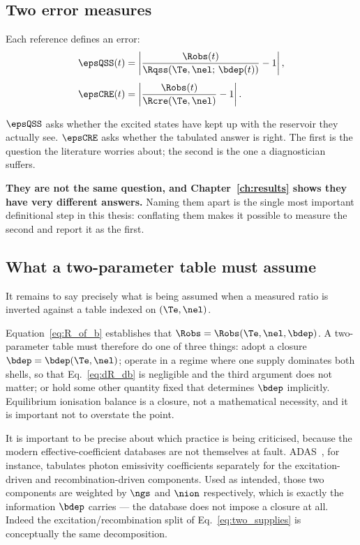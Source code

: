 \subsection{Two error measures}

Each reference defines an error:
\begin{align}
  \epsQSS(t) &= \left|\frac{\Robs(t)}
                     {\Rqss\!\left(\Te,\nel;\,\bdep(t)\right)} - 1\right|,
  \label{eq:eps_qss}\\[4pt]
  \epsCRE(t) &= \left|\frac{\Robs(t)}
                     {\Rcre\!\left(\Te,\nel\right)} - 1\right|.
  \label{eq:eps_cre}
\end{align}

$\epsQSS$ asks whether the excited states have kept up with the reservoir they
actually see. $\epsCRE$ asks whether the tabulated answer is right. The first is
the question the literature worries about; the second is the one a
diagnostician suffers.

\textbf{They are not the same question, and Chapter~\ref{ch:results} shows they
have very different answers.} Naming them apart is the single most important
definitional step in this thesis: conflating them makes it possible to measure
the second and report it as the first.

\subsection{What a two-parameter table must assume}

It remains to say precisely what is being assumed when a measured ratio is
inverted against a table indexed on $(\Te,\nel)$.

Equation~\eqref{eq:R_of_b} establishes that $\Robs = \Robs(\Te,\nel,\bdep)$.
A two-parameter table must therefore do one of three things: adopt a closure
$\bdep = \bdep(\Te,\nel)$; operate in a regime where one supply dominates both
shells, so that Eq.~\eqref{eq:dR_db} is negligible and the third argument does
not matter; or hold some other quantity fixed that determines $\bdep$
implicitly. Equilibrium ionisation balance is a closure, not a mathematical
necessity, and it is important not to overstate the point.

It is important to be precise about which practice is being criticised, because
the modern effective-coefficient databases are not themselves at fault.
ADAS~\cite{Summers2006}, for instance, tabulates photon emissivity coefficients
separately for the excitation-driven and recombination-driven components. Used
as intended, those two components are weighted by $\ngs$ and $\nion$
respectively, which is exactly the information $\bdep$ carries --- the database
does not impose a closure at all. Indeed the excitation/recombination split of
Eq.~\eqref{eq:two_supplies} is conceptually the same decomposition.


